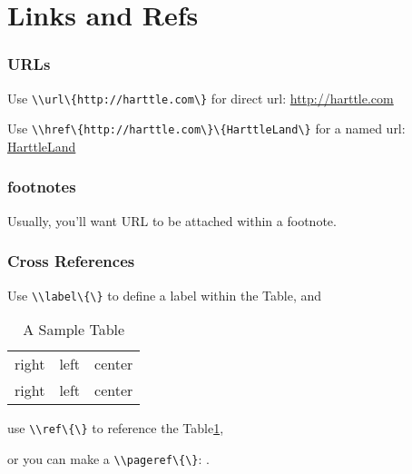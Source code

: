 \section{Links and Refs}


\begin{frame}
\frametitle{URLs}
Use \lstinline|\\url\{http://harttle.com\}| for direct url: \url{http://harttle.com}

\bigskip

Use \lstinline|\\href\{http://harttle.com\}\{HarttleLand\}| for a named url: 
\href{http://harttle.com}{HarttleLand}
\end{frame}


\begin{frame}
\frametitle{footnotes}
Usually, you'll want URL to be attached within a footnote\footnotemark.

\end{frame}


\begin{frame}
\frametitle{Cross References}

Use \lstinline|\\label\{\}| to define a label within the Table, and

\begin{table}
\begin{tabular}{ rlc }
    right & left & center \\
    right & left & center \\
\end{tabular}
\caption{A Sample Table}\label{tab:sample}
\end{table}

use \lstinline|\\ref\{\}| to reference the Table\ref{tab:sample},

or you can make a \lstinline|\\pageref\{\}|: \pageref{tab:sample}.
\end{frame}
